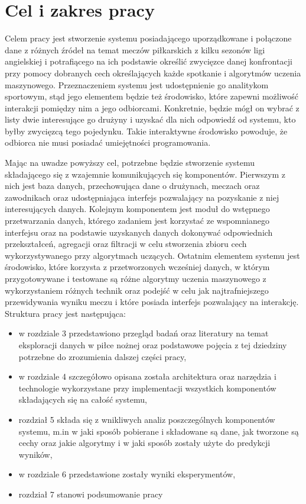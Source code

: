 \chapter{Cel i zakres pracy}

\noindent Celem pracy jest stworzenie systemu posiadającego uporządkowane i połączone dane z różnych źródeł na temat meczów piłkarskich z kilku sezonów ligi angielskiej i potrafiącego na ich podstawie określić zwycięzce danej konfrontacji przy pomocy dobranych cech określających każde spotkanie i algorytmów uczenia maszynowego. Przeznaczeniem systemu jest udostępnienie go analitykom sportowym, stąd jego elementem będzie też środowisko, które zapewni możliwość interakcji pomiędzy nim a jego odbiorcami. Konkretnie, będzie mógł on wybrać z listy dwie interesujące go drużyny i uzyskać dla nich odpowiedź od systemu, kto byłby zwycięzcą tego pojedynku. Takie interaktywne środowisko powoduje, że odbiorca nie musi posiadać umiejętności programowania.


Mając na uwadze powyższy cel, potrzebne będzie stworzenie systemu składającego się z wzajemnie komunikujących się komponentów. Pierwszym z nich jest baza danych, przechowująca dane o drużynach, meczach oraz zawodnikach oraz udostępniająca interfejs pozwalający na pozyskanie z niej interesujących danych. Kolejnym komponentem jest moduł do wstępnego przetwarzania danych, którego zadaniem jest korzystać ze wspomnianego interfejsu oraz na podstawie uzyskanych danych dokonywać odpowiednich przekształceń, agregacji oraz filtracji w celu stworzenia zbioru cech wykorzystywanego przy algorytmach uczących. Ostatnim elementem systemu jest środowisko, które korzysta z przetworzonych wcześniej danych, w którym przygotowywane i testowane są różne algorytmy uczenia maszynowego z wykorzystaniem różnych technik oraz podejść w celu jak najtrafniejszego przewidywania wyniku meczu i które posiada interfejs pozwalający na interakcję.
\\

\noindent Struktura pracy jest następująca:
\begin{itemize}
    \item w rozdziale 3 przedstawiono przegląd badań oraz literatury na temat eksploracji danych w piłce nożnej oraz podstawowe pojęcia z tej dziedziny potrzebne do zrozumienia dalszej części pracy,
    \item w rozdziale 4 szczegółowo opisana została architektura oraz narzędzia i technologie wykorzystane przy implementacji wszystkich komponentów składających się na całość systemu,
    \item rozdział 5 składa się z wnikliwych analiz poszczególnych komponentów systemu, m.in w jaki sposób pobierane i składowane są dane, jak tworzone są cechy oraz jakie algorytmy i w jaki sposób zostały użyte do predykcji wyników,
    \item w rozdziale 6 przedstawione zostały wyniki eksperymentów,
    \item rozdział 7 stanowi podsumowanie pracy
\end{itemize}

